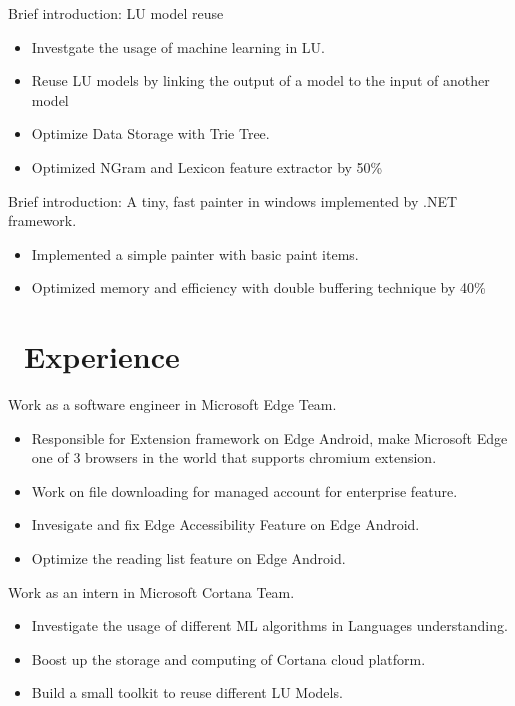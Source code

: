 \documentclass{resume}
\begin{document}
Brief introduction: LU model reuse
\begin{itemize}
	\item Investgate the usage of machine learning in LU.
  \item Reuse LU models by linking the output of a model to the input of another model
	\item Optimize Data Storage with Trie Tree.
  \item Optimized NGram and Lexicon feature extractor by 50\%
\end{itemize}

Brief introduction: A tiny, fast painter in windows implemented by .NET framework.
\begin{itemize}
  \item Implemented a simple painter with basic paint items.
  \item Optimized memory and efficiency with double buffering technique by 40\%
\end{itemize}

\section{\faUsers\ Experience}

Work as a software engineer in Microsoft Edge Team.
\begin{itemize}
    \item Responsible for Extension framework on Edge Android, make Microsoft Edge one of 3 browsers in the world that supports chromium extension.
    \item Work on file downloading for managed account for enterprise feature.
    \item Invesigate and fix Edge Accessibility Feature on Edge Android.
    \item Optimize the reading list feature on Edge Android.
\end{itemize}

Work as an intern in Microsoft Cortana Team.
\begin{itemize}
    \item Investigate the usage of different ML algorithms in Languages understanding.
    \item Boost up the storage and computing of Cortana cloud platform.
    \item Build a small toolkit to reuse different LU Models.
\end{itemize}
\end{document}
